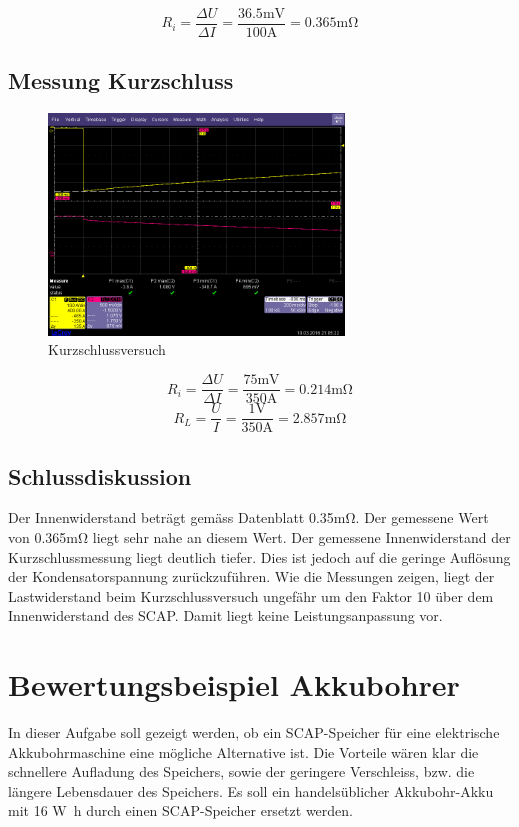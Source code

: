 \documentclass[a4,paper,fleqn]{article}
\begin{document}
\[ R_i = \frac{\Delta U}{\Delta I} 
= \frac{36.5\si{\milli\volt}}{100\si{\ampere}} = 0.365\si{\milli\ohm} \]

\clearpage
\subsection{Messung Kurzschluss}
\begin{figure}[h!]
    \centering
    \includegraphics[width=0.7\textwidth, trim=0 20 0 45, clip=true]{fig/short1.png}
    \caption{Kurzschlussversuch}
    \label{fig:short}
\end{figure}

\[ R_i = \frac{\Delta U}{\Delta I} 
= \frac{75\si{\milli\volt}}{350\si{\ampere}} = 0.214\si{\milli\ohm} \]
\[ R_L = \frac{U}{I} = \frac{1\si{\volt}}{350\si{\ampere}} 
= 2.857\si{\milli\ohm} \]

\subsection{Schlussdiskussion}
Der Innenwiderstand beträgt gemäss Datenblatt 0.35\si{\milli\ohm}. Der 
gemessene Wert von 0.365\si{\milli\ohm} liegt sehr nahe an diesem Wert. Der 
gemessene Innenwiderstand der Kurzschlussmessung liegt deutlich tiefer. Dies 
ist jedoch auf die geringe Auflösung der Kondensatorspannung zurückzuführen. 
Wie die Messungen zeigen, liegt der Lastwiderstand beim Kurzschlussversuch 
ungefähr um den Faktor 10 über dem Innenwiderstand des SCAP. Damit liegt keine 
Leistungsanpassung vor. 

\clearpage
\section{Bewertungsbeispiel Akkubohrer}
In dieser Aufgabe soll gezeigt werden, ob ein SCAP-Speicher für eine 
elektrische Akkubohrmaschine eine mögliche Alternative ist. Die Vorteile wären 
klar die schnellere Aufladung des Speichers, sowie der geringere Verschleiss, 
bzw. die längere Lebensdauer des Speichers. Es soll ein handelsüblicher 
Akkubohr-Akku mit 16 \si{\watt\hour} durch einen SCAP-Speicher ersetzt werden.
\end{document}
